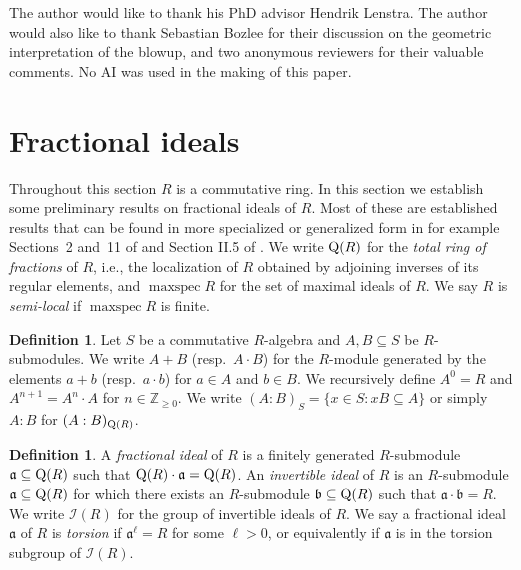 \documentclass{amsart}
\theoremstyle{plain}
\theoremstyle{definition}
\newtheorem{definition}[theorem]{Definition}
\DeclareMathOperator{\maxspec}{maxspec}
\newcommand{\Z}{\ensuremath{\mathbb{Z}}}
\begin{document}
The author would like to thank his PhD advisor Hendrik Lenstra. %
The author would also like to thank Sebastian Bozlee for their discussion on the geometric interpretation of the blowup, and two anonymous reviewers for their valuable comments.
No AI was used in the making of this paper.

\section{Fractional ideals}

Throughout this section \(R\) is a commutative ring. 
In this section we establish some preliminary results on fractional ideals of \(R\).
Most of these are established results that can be found in more specialized or generalized form in for example  Sections~2 and~11 of \cite{Eisenbud} and Section II.5 of \cite{Bourbaki}.
We write \(\textup{Q}(R)\) for the \emph{total ring of fractions} of \(R\), i.e., the localization of \(R\) obtained by adjoining inverses of its regular elements, and \(\maxspec R\) for the set of maximal ideals of \(R\).
We say \(R\) is \emph{semi-local} if \(\maxspec R\) is finite.

\begin{definition}
Let \(S\) be a commutative \(R\)-algebra and \(A,B\subseteq S\) be \(R\)-submodules. 
We write \(A+B\) (resp.\ \(A\cdot B\)) for the \(R\)-module generated by the elements \(a+b\) (resp.\ \(a\cdot b\)) for \(a\in A\) and \(b\in B\).
We recursively define \(A^0=R\) and \(A^{n+1}=A^n\cdot A\) for \(n\in\Z_{\geq 0}\).
We write \((A:B)_S=\{x\in S : xB\subseteq A\}\) or simply \(A:B\) for \((A:B)_{\textup{Q}(R)}\).
\end{definition}

\begin{definition}
A \emph{fractional ideal} of \(R\) is a finitely generated \(R\)-submodule \(\mathfrak{a}\subseteq \textup{Q}(R)\) such that \(\textup{Q}(R)\cdot \mathfrak{a}=\textup{Q}(R)\). 
An \emph{invertible ideal} of \(R\) is an \(R\)-submodule \(\mathfrak{a}\subseteq\textup{Q}(R)\) for which there exists an \(R\)-submodule \(\mathfrak{b}\subseteq\textup{Q}(R)\) such that \(\mathfrak{a}\cdot \mathfrak{b}=R\). 
We write \(\mathcal{I}(R)\) for the group of invertible ideals of \(R\).
We say a fractional ideal $\mathfrak{a}$ of $R$ is \emph{torsion} if $\mathfrak{a}^\ell=R$ for some $\ell>0$, or equivalently if $\mathfrak{a}$ is in the torsion subgroup of $\mathcal{I}(R)$.
\end{definition}
\end{document}
